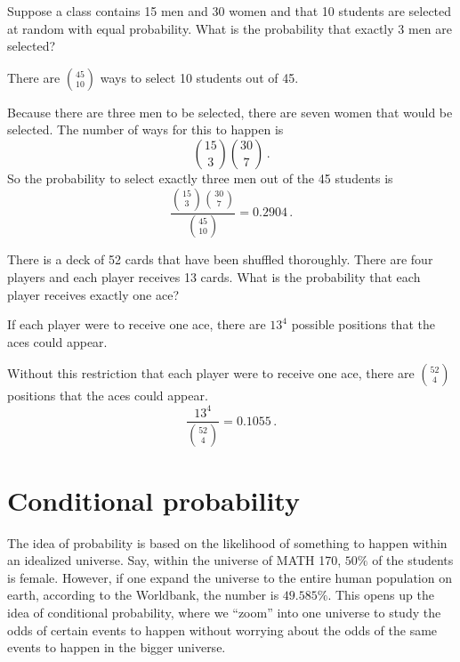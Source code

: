\begin{example}
   Suppose a class contains 15 men and 30 women and that 10 students are selected
   at random with equal probability.
   What is the probability that exactly 3 men are selected?

   There are $\binom {45}{10}$ ways to select 10 students out of 45.

   Because there are three men to be selected, there are seven women that would
   be selected. The number of ways for this to happen is
    \begin{equation*}
        \binom {15}{3} \binom{30}7 \,.
    \end{equation*}
    So the probability to select exactly three men out of the 45 students is
    \begin{equation*}
        \frac{ \binom {15}{3} \binom{30}7}{ \binom {45}{10}} = 0.2904 \,. 
    \end{equation*}
\end{example}

\begin{example}
    There is a deck of 52 cards that have been shuffled thoroughly.
    There are four players and each player receives 13 cards.
    What is the probability that each player receives exactly one ace?

    If each player were to receive one ace, there are $13^4$ possible positions
    that the aces could appear.

    Without this restriction that each player were to receive one ace,
    there are $\binom {52}4$ positions that the aces could appear.
    \begin{equation*}
        \frac{13^4}{\binom {52}4} = 0.1055 \,.
    \end{equation*}
\end{example}

\section{Conditional probability}
The idea of probability is based on the likelihood of something to happen
within an idealized universe.
Say, within the universe of MATH 170,  $50\%$ of the students is female.
However, if one expand the universe to the entire human population on earth,
according to the Worldbank, the number is $49.585\%$.
This opens up the idea of conditional probability, where we ``zoom'' into one universe to study the odds of certain events to happen without worrying about
the odds of the same events to happen in the bigger universe.


